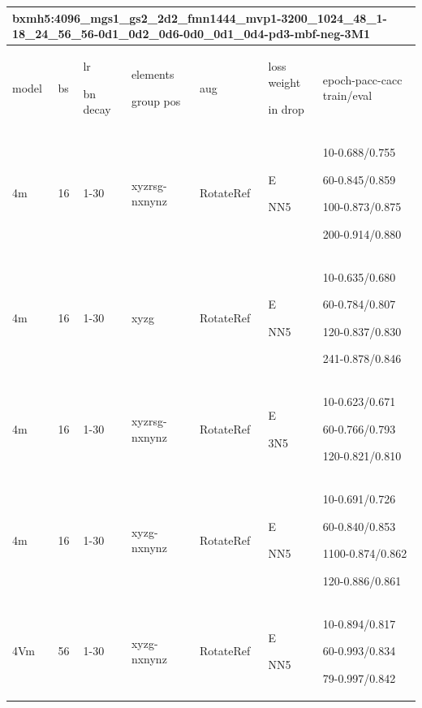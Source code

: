\documentclass[,table,dvipsnames]{article}
\begin{document}
\begin{tabular}{|p{1.5cm}|p{1.5cm}|p{1cm}|p{1.5cm}|p{1.5cm}|p{1.5cm}|p{5cm}| }
	\hline
	\multicolumn{7}{|p{14cm}|}{bxmh5:4096\_mgs1\_gs2\_2d2\_fmn1444\_mvp1-3200\_1024\_48\_1-18\_24\_56\_56-0d1\_0d2\_0d6-0d0\_0d1\_0d4-pd3-mbf-neg-3M1\par 
	}\\
	\hline
	model & bs& lr\par bn decay & elements\par group pos & aug & loss weight\par in drop & epoch-pacc-cacc train/eval \\
	\hline
	
	4m & 16 & 1-30 & xyzrsg-nxnynz & RotateRef & E\par NN5 & 10-0.688/0.755\par 60-0.845/0.859\par 100-0.873/0.875\par 200-0.914/0.880\\
	\hline 
	4m & 16 & 1-30 & xyzg & RotateRef & E\par NN5 & 10-0.635/0.680\par 60-0.784/0.807\par 120-0.837/0.830\par 241-0.878/0.846\\
	\hline 
	4m & 16 & 1-30 & xyzrsg-nxnynz & RotateRef & E\par 3N5 & 10-0.623/0.671\par 60-0.766/0.793\par 120-0.821/0.810\\
	\hline 
	4m & 16 & 1-30 & xyzg-nxnynz & RotateRef & E\par NN5 & 10-0.691/0.726\par 60-0.840/0.853\par 1100-0.874/0.862\par 120-0.886/0.861\\
	\hline 
	4Vm & 56 & 1-30 & xyzg-nxnynz & RotateRef & E\par NN5 & 10-0.894/0.817\par 60-0.993/0.834\par 79-0.997/0.842\\
	\hline
\end{tabular}
\par
\noindent
\end{document}
